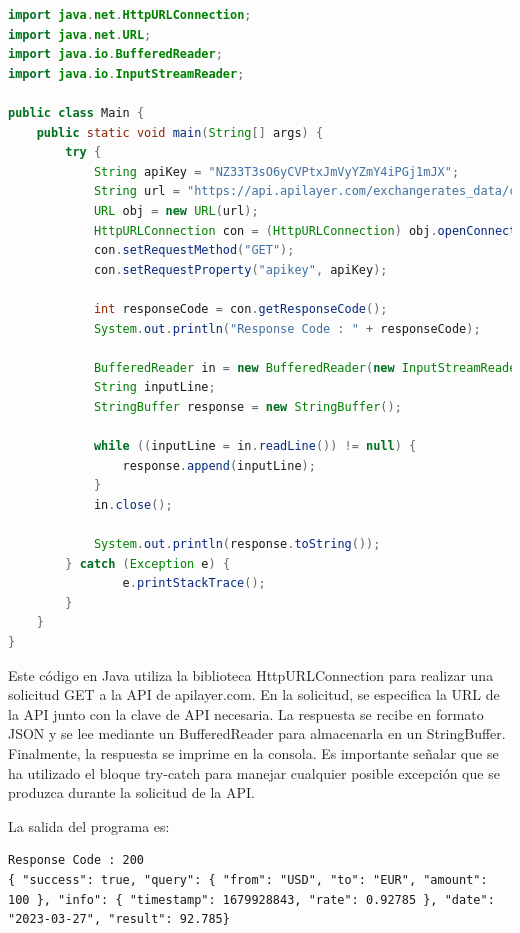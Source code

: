 \documentclass[executivepaper]{article}
\begin{document}
\begin{lstlisting}[language=Java, caption={Ejemplo de consumo de API con Java}, label=lst:ejemplo-api-java]
import java.net.HttpURLConnection;
import java.net.URL;
import java.io.BufferedReader;
import java.io.InputStreamReader;

public class Main {
    public static void main(String[] args) {
        try {
            String apiKey = "NZ33T3sO6yCVPtxJmVyYZmY4iPGj1mJX";
            String url = "https://api.apilayer.com/exchangerates_data/convert?to=EUR&from=USD&amount=100";
            URL obj = new URL(url);
            HttpURLConnection con = (HttpURLConnection) obj.openConnection();
            con.setRequestMethod("GET");
            con.setRequestProperty("apikey", apiKey);

            int responseCode = con.getResponseCode();
            System.out.println("Response Code : " + responseCode);

            BufferedReader in = new BufferedReader(new InputStreamReader(con.getInputStream()));
            String inputLine;
            StringBuffer response = new StringBuffer();

            while ((inputLine = in.readLine()) != null) {
                response.append(inputLine);
            }
            in.close();

            System.out.println(response.toString());
        } catch (Exception e) {
                e.printStackTrace();
        }
    }
}
\end{lstlisting}
Este código en Java utiliza la biblioteca HttpURLConnection para realizar una solicitud GET a la API de apilayer.com. En la solicitud, se especifica la URL de la API junto con la clave de API necesaria. La respuesta se recibe en formato JSON y se lee mediante un BufferedReader para almacenarla en un StringBuffer. Finalmente, la respuesta se imprime en la consola. Es importante señalar que se ha utilizado el bloque try-catch para manejar cualquier posible excepción que se produzca durante la solicitud de la API.

La salida del programa es:
\begin{lstlisting}
Response Code : 200
{ "success": true, "query": { "from": "USD", "to": "EUR", "amount": 100 }, "info": { "timestamp": 1679928843, "rate": 0.92785 }, "date": "2023-03-27", "result": 92.785}
\end{lstlisting}

\newpage
\end{document}
